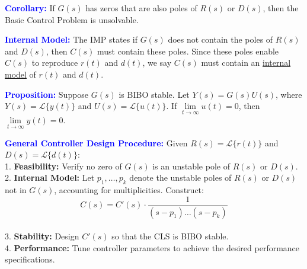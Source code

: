 \documentclass[5pt]{extarticle} %
\begin{document}
\begin{paracol}{3}
{    \textcolor{blue}{\textbf{Corollary:}} If $G(s)$ has zeros that are also poles of $R(s)$ or $D(s)$, then the Basic Control Problem is unsolvable.

    \textcolor{blue}{\textbf{Internal Model:}} The IMP states if $G(s)$ does not contain the poles of $R(s)$ and $D(s)$, then $C(s)$ must contain these poles. Since these poles enable $C(s)$ to reproduce $r(t)$ and $d(t)$, we say $C(s)$ must contain an \underline{internal model} of $r(t)$ and $d(t)$.

    \textcolor{blue}{\textbf{Proposition:}} Suppose $G(s)$ is BIBO stable. Let $Y(s) = G(s) U(s)$, where $Y(s) = \mathcal{L}\{ y(t) \}$ and $U(s) = \mathcal{L}\{ u(t) \}$. If $\lim\limits_{t \to \infty} u(t) = 0$, then $\lim\limits_{t \to \infty} y(t) = 0$.

    \textcolor{blue}{\textbf{General Controller Design Procedure:}} Given $R(s) = \mathcal{L}\{ r(t) \}$ and $D(s) = \mathcal{L}\{ d(t) \}$: \\
    1. \textbf{Feasibility:} Verify no zero of $G(s)$ is an unstable pole of $R(s)$ or $D(s)$. \\
    2. \textbf{Internal Model:} Let $p_1, \dots, p_k$ denote the unstable poles of $R(s)$ or $D(s)$ not in $G(s)$, accounting for multiplicities. Construct:
    \[ C(s) = C'(s) \cdot \frac{1}{(s - p_1) \dots (s - p_k)} \] \\
    3. \textbf{Stability:} Design $C'(s)$ so that the CLS is BIBO stable. \\
    4. \textbf{Performance:} Tune controller parameters to achieve the desired performance specifications.



        }
\end{paracol}
\end{document}
